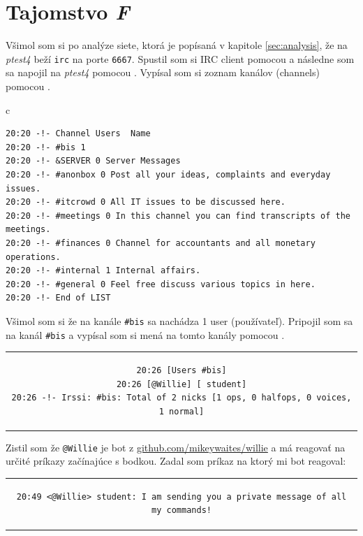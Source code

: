 \documentclass[11pt,a4paper]{article}
\begin{document}
\section{Tajomstvo \textit{F}}\label{sec:F}

Všimol som si po analýze siete, ktorá je popísaná v kapitole \ref{sec:analysis}, že na \textit{ptest4} beží \texttt{irc} na porte \texttt{6667}. Spustil som si IRC client pomocou  a následne som sa napojil na \textit{ptest4} pomocou . Vypísal som si zoznam kanálov (channels) pomocou .

\begin{center}
\begin{tabular}{c}
\begin{lstlisting}[basicstyle=\footnotesize]
20:20 -!- Channel Users  Name
20:20 -!- #bis 1
20:20 -!- &SERVER 0 Server Messages
20:20 -!- #anonbox 0 Post all your ideas, complaints and everyday issues.
20:20 -!- #itcrowd 0 All IT issues to be discussed here.
20:20 -!- #meetings 0 In this channel you can find transcripts of the meetings.
20:20 -!- #finances 0 Channel for accountants and all monetary operations.
20:20 -!- #internal 1 Internal affairs.
20:20 -!- #general 0 Feel free discuss various topics in here.
20:20 -!- End of LIST
\end{lstlisting}
\end{tabular}
\end{center}

Všimol som si že na kanále \texttt{\#bis} sa nachádza 1 user (používateľ). Pripojil som sa na kanál \texttt{\#bis} a vypísal som si mená na tomto kanály pomocou .

\begin{center}
\begin{tabular}{c}
\begin{lstlisting}[basicstyle=\footnotesize]
20:26 [Users #bis]
20:26 [@Willie] [ student]
20:26 -!- Irssi: #bis: Total of 2 nicks [1 ops, 0 halfops, 0 voices, 1 normal]
\end{lstlisting}
\end{tabular}
\end{center}

Zistil som že \texttt{@Willie} je bot z {\color{blue}\href{https://github.com/mikeywaites/willie}{github.com/mikeywaites/willie}} a má reagovať na určité príkazy začínajúce s bodkou. Zadal som príkaz  na ktorý mi bot reagoval:

\begin{center}
\begin{tabular}{c}
\begin{lstlisting}[basicstyle=\footnotesize]
20:49 <@Willie> student: I am sending you a private message of all my commands!
\end{lstlisting}
\end{tabular}
\end{center}
\end{document}
